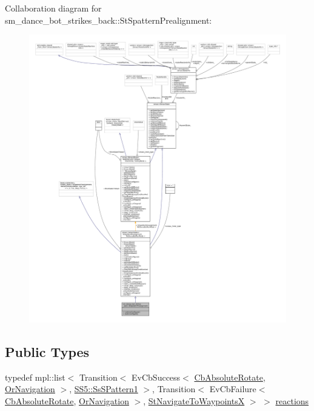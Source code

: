 Collaboration diagram for sm\+\_\+dance\+\_\+bot\+\_\+strikes\+\_\+back\+:\+:St\+Spattern\+Prealignment\+:
\nopagebreak
\begin{figure}[H]
\begin{center}
\leavevmode
\includegraphics[width=350pt]{structsm__dance__bot__strikes__back_1_1StSpatternPrealignment__coll__graph}
\end{center}
\end{figure}
\subsection*{Public Types}
\begin{DoxyCompactItemize}
\item 
typedef mpl\+::list$<$ Transition$<$ Ev\+Cb\+Success$<$ \hyperlink{classcl__move__base__z_1_1CbAbsoluteRotate}{Cb\+Absolute\+Rotate}, \hyperlink{classsm__dance__bot__strikes__back_1_1OrNavigation}{Or\+Navigation} $>$, \hyperlink{structsm__dance__bot__strikes__back_1_1SS5_1_1SsSPattern1}{S\+S5\+::\+Ss\+S\+Pattern1} $>$, Transition$<$ Ev\+Cb\+Failure$<$ \hyperlink{classcl__move__base__z_1_1CbAbsoluteRotate}{Cb\+Absolute\+Rotate}, \hyperlink{classsm__dance__bot__strikes__back_1_1OrNavigation}{Or\+Navigation} $>$, \hyperlink{structsm__dance__bot__strikes__back_1_1StNavigateToWaypointsX}{St\+Navigate\+To\+WaypointsX} $>$ $>$ \hyperlink{structsm__dance__bot__strikes__back_1_1StSpatternPrealignment_a40c8319a75f84dc9633a9abc9a5abe7d}{reactions}
\end{DoxyCompactItemize}
